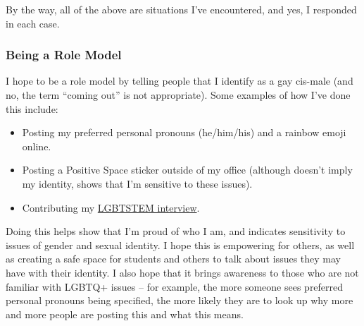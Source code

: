 \documentclass[]{article}
\providecommand{\tightlist}{%
  \setlength{\itemsep}{0pt}\setlength{\parskip}{0pt}}
\begin{document}
By the way, all of the above are situations I've encountered, and yes, I responded in each case.

\hypertarget{being-a-role-model}{%
\subsubsection{Being a Role Model}\label{being-a-role-model}}

I hope to be a role model by telling people that I identify as a gay cis-male (and no, the term ``coming out'' is not appropriate). Some examples of how I've done this include:

\begin{itemize}
\tightlist
\item
  Posting my preferred personal pronouns (he/him/his) and a rainbow emoji online.
\item
  Posting a Positive Space sticker outside of my office (although doesn't imply my identity, shows that I'm sensitive to these issues).
\item
  Contributing my \href{https://lgbtstem.wordpress.com/2019/11/09/an-interview-with-vincenzo-coia/}{LGBTSTEM interview}.
\end{itemize}

Doing this helps show that I'm proud of who I am, and indicates sensitivity to issues of gender and sexual identity. I hope this is empowering for others, as well as creating a safe space for students and others to talk about issues they may have with their identity. I also hope that it brings awareness to those who are not familiar with LGBTQ+ issues -- for example, the more someone sees preferred personal pronouns being specified, the more likely they are to look up why more and more people are posting this and what this means.
\end{document}
